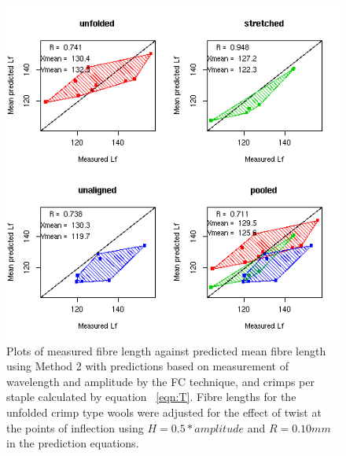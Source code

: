 %

\begin{figure}[!h]
  \centering
  \includegraphics[width=1.1\textwidth]{figfcpredlf.png}
  \caption{Plots of measured fibre length against predicted mean fibre length using Method 2 with predictions based on measurement of wavelength and amplitude by the FC technique, and crimps per staple calculated by equation ~\ref{eqn:T}. Fibre lengths for the unfolded crimp type wools were adjusted for the effect of twist at the points of inflection using $H = 0.5 * amplitude$ and $R = 0.10 mm$ in the prediction equations.}
  \label{fig:fcpredlf}
\end{figure}

%

